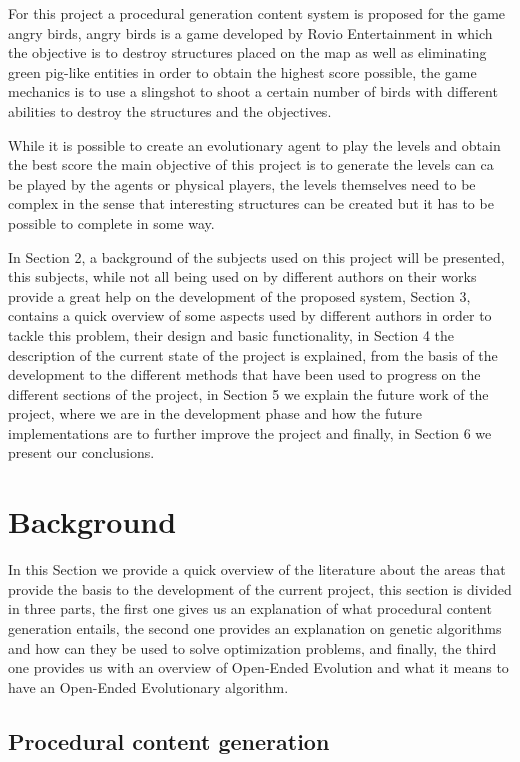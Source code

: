 \documentclass[graybox]{svmult}
\begin{document}
For this project a procedural generation content system is proposed for the game angry birds, angry birds is a game developed by Rovio Entertainment in which the objective is to destroy structures placed on the map as well as eliminating green pig-like entities in order to obtain the highest score possible, the game mechanics is to use a slingshot to shoot a certain number of birds with different abilities to destroy the structures and the objectives. \cite{RovioEntertainmentCorporation2009}

 
While it is possible to create an evolutionary agent to play the levels and obtain the best score the main objective of this project is to generate the levels can ca be played by the agents or physical players, the levels themselves need to be complex in the sense that interesting structures can be created but it has to be possible to complete in some way.
 
In Section 2, a background of the subjects used on this project will be presented, this subjects, while not all being used on by different authors on their works provide a great help on the development of the proposed system, Section 3, contains a quick overview of some aspects used by different authors in order to tackle this problem, their design and basic functionality, in Section 4 the description of the current state of the project is explained, from the basis of the development to the different methods that have been used to progress on the different sections of the project, in Section 5 we explain the future work of the project, where we are in the development phase and how the future implementations are to further improve the project and finally, in Section 6 we present our conclusions.
 
\section{Background}
\label{sec:3}
In this Section we provide a quick overview of the literature about the areas that provide the basis to the development of the current project, this section is divided in three parts, the first one gives us an explanation of what procedural content generation entails, the second one provides an explanation on genetic algorithms and how can they be used to solve optimization problems, and finally, the third one provides us with an overview of Open-Ended Evolution and what it means to have an Open-Ended Evolutionary algorithm.

\subsection{Procedural content generation}
\end{document}
